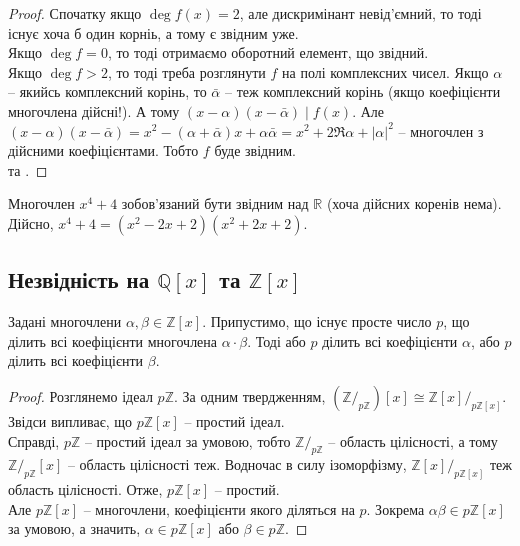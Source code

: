 \documentclass{math_library}
\begin{document}
\begin{proof}
\rightproof Спочатку якщо $\deg f(x) = 2$, але дискримінант невід'ємний, то тоді існує хоча б один корніь, а тому є звідним уже.\\
Якщо $\deg f = 0$, то тоді отримаємо оборотний елемент, що звідний.\\
Якщо $\deg f > 2$, то тоді треба розглянути $f$ на полі комплексних чисел. Якщо $\alpha$ -- якийсь комплексний корінь, то $\bar{\alpha}$ -- теж комплексний корінь (якщо коефіцієнти многочлена дійсні!). А тому $(x-\alpha)(x-\bar{\alpha}) \mid f(x)$. Але $(x-\alpha)(x-\bar{\alpha}) = x^2 - (\alpha + \bar{\alpha}) x + \alpha \bar{\alpha} = x^2 + 2 \Re \alpha + |\alpha|^2$ -- многочлен з дійсними коефіцієнтами. Тобто $f$ буде звідним.
\bigskip \\
\leftproof {} та .
\end{proof}

\begin{example}
Многочлен $x^4 + 4$ зобов'язаний бути звідним над $\mathbb{R}$ (хоча дійсних коренів нема). Дійсно, $x^4 + 4 = (x^2-2x+2)(x^2+2x+2)$.
\end{example}

\subsection{Незвідність на $\mathbb{Q}[x]$ та $\mathbb{Z}[x]$}
\begin{lemma}
Задані многочлени $\alpha,\beta \in \mathbb{Z}[x]$. Припустимо, що існує просте число $p$, що ділить всі коефіцієнти многочлена $\alpha \cdot \beta$. Тоді або $p$ ділить всі коефіцієнти $\alpha$, або $p$ ділить всі коефіцієнти $\beta$.
\end{lemma}

\begin{proof}
Розглянемо ідеал $p \mathbb{Z}$. За одним твердженням, $(\mathbb{Z}/_{p \mathbb{Z}})[x] \cong \mathbb{Z}[x]/_{p \mathbb{Z}[x]}$. Звідси випливає, що $p \mathbb{Z}[x]$ -- простий ідеал.\\
Справді, $p \mathbb{Z}$ -- простий ідеал за умовою, тобто $\mathbb{Z}/_{p \mathbb{Z}}$ -- область цілісності, а тому $\mathbb{Z}/_{p \mathbb{Z}}[x]$ -- область цілісності теж. Водночас в силу ізоморфізму, $\mathbb{Z}[x]/_{p \mathbb{Z}[x]}$ теж область цілісності. Отже, $p \mathbb{Z}[x]$ -- простий.\\
Але $p \mathbb{Z}[x]$ -- многочлени, коефіцієнти якого діляться на $p$. Зокрема $\alpha \beta \in p \mathbb{Z}[x]$ за умовою, а значить, $\alpha \in p \mathbb{Z}[x]$ або $\beta \in p \mathbb{Z}$.
\end{proof}
\end{document}
